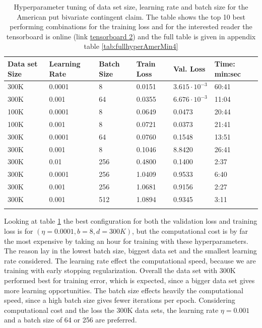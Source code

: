 \begin{table}[th]
\caption{Hyperparameter tuning of data set size, learning rate and batch size for the American put bivariate contingent claim. The table shows the top 10 best performing combinations for the training loss and for the interested reader the tensorboard is online (link \href{https://tensorboard.dev/experiment/mQWtOskJRoWrmrFgOIVQ4g/}{tensorboard 2}) and the full table is given in appendix table \ref{tab:fullhyperAmerMin4}}
\label{tab:hyperAmerMin1}
\centering
\begin{tabular}{llllll}
\toprule
\textbf{Data set Size} & \textbf{Learning Rate} & \textbf{Batch Size} & \textbf{Train Loss} & \textbf{Val. Loss} & \textbf{Time: min:sec} \\
\midrule
300K    & 0.0001 & 8     & 0.0151 & $3.615\cdot 10^{-3}$ & 60:41\\ 
300K    & 0.001  & 64    & 0.0355 & $6.676\cdot 10^{-3}$ & 11:04\\ 
100K    & 0.0001 & 8     & 0.0649 & 0.0473 & 20:44\\ 
100K    & 0.001  & 8     & 0.0721 & 0.0373 & 21:41\\ 
300K    & 0.0001 & 64    & 0.0760 & 0.1548 & 13:51\\ 
300K    & 0.001  & 8     & 0.1046 & 8.8420 & 26:41\\ 
300K    & 0.01   & 256   & 0.4800 & 0.1400 & 2:37\\ 
300K    & 0.0001 & 256   & 1.0409 & 0.9533 & 6:40\\ 
300K    & 0.001  & 256   & 1.0681 & 0.9156 & 2:27 \\ 
300K    & 0.001  & 512   & 1.0894 & 0.9345 & 3:11 \\ 
\bottomrule\\
\end{tabular}
\end{table}

Looking at table \ref{tab:hyperAmerMin1} the best configuration for both the validation loss and training loss is for $(\eta=0.0001, b=8, d=300K)$, but the computational cost is by far the most expensive by taking an hour for training with these hyperparameters. The reason lay in the lowest batch size, biggest data set and the smallest learning rate considered. The learning rate effect the computational speed, because we are training with early stopping regularization. Overall the data set with 300K performed best for training error, which is expected, since a bigger data set gives more learning opportunities. The batch size effects heavily the computational speed, since a high batch size gives fewer iterations per epoch. Considering computational cost and the loss the 300K data sets, the learning rate $\eta=0.001$ and a batch size of 64 or 256 are preferred.\\

